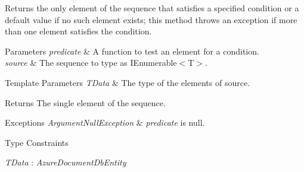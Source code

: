 Returns the only element of the sequence that satisfies a specified condition or a default value if no such element exists; this method throws an exception if more than one element satisfies the condition. 


\begin{DoxyParams}{Parameters}
{\em predicate} & A function to test an element for a condition.\\
\hline
{\em source} & The sequence to type as I\+Enumerable$<$\+T$>$.\\
\hline
\end{DoxyParams}

\begin{DoxyTemplParams}{Template Parameters}
{\em T\+Data} & The type of the elements of source.\\
\hline
\end{DoxyTemplParams}
\begin{DoxyReturn}{Returns}
The single element of the sequence.
\end{DoxyReturn}

\begin{DoxyExceptions}{Exceptions}
{\em Argument\+Null\+Exception} & {\itshape predicate}  is null.\\
\hline
\end{DoxyExceptions}
\begin{Desc}
\item[Type Constraints]\begin{description}
\item[{\em T\+Data} : {\em Azure\+Document\+Db\+Entity}]\end{description}
\end{Desc}
